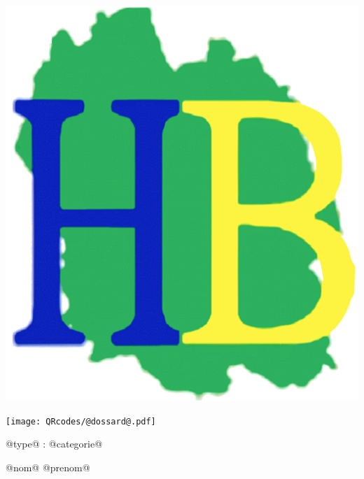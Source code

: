 \Huge

\begin{block} %
{}\hfill {}
{}\hfill {}
\begin{minipage}{0.15\linewidth}
\includegraphics[width=\textwidth]{logo-HB.png}
\end{minipage}
{}\hfill {}



\begin{minipage}{0.48\linewidth}
\texttt{[image: QRcodes/@dossard@.pdf]}
\end{minipage}
\begin{minipage}{0.5\linewidth}
{}\hfill {}
{}\hfill {}
\end{minipage}


\vspace{0.5cm}
\begin{minipage}{0.47\linewidth}
@type@ : @categorie@
\end{minipage}
\hfill {}
\begin{minipage}{0.5\linewidth}
@nom@ @prenom@
\end{minipage}
\hfill {}

\end{block}

\vfill


\vfill

